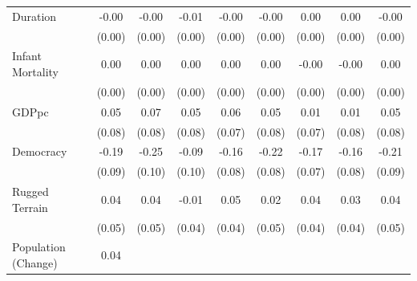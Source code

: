 \documentclass[12pt, letterpaper]{article}
\begin{document}
\begin{table}[htbp]
\begin{small}
\begin{tabular}{l*{8}{c}}
Duration            &       -0.00         &       -0.00         &       -0.01\sym{+}  &       -0.00         &       -0.00         &        0.00         &        0.00         &       -0.00         \\
                    &      (0.00)         &      (0.00)         &      (0.00)         &      (0.00)         &      (0.00)         &      (0.00)         &      (0.00)         &      (0.00)         \\
Infant Mortality    &        0.00         &        0.00         &        0.00         &        0.00         &        0.00         &       -0.00         &       -0.00         &        0.00         \\
                    &      (0.00)         &      (0.00)         &      (0.00)         &      (0.00)         &      (0.00)         &      (0.00)         &      (0.00)         &      (0.00)         \\
GDPpc               &        0.05         &        0.07         &        0.05         &        0.06         &        0.05         &        0.01         &        0.01         &        0.05         \\
                    &      (0.08)         &      (0.08)         &      (0.08)         &      (0.07)         &      (0.08)         &      (0.07)         &      (0.08)         &      (0.08)         \\
Democracy           &       -0.19\sym{**} &       -0.25\sym{**} &       -0.09         &       -0.16\sym{*}  &       -0.22\sym{**} &       -0.17\sym{**} &       -0.16\sym{*}  &       -0.21\sym{**} \\
                    &      (0.09)         &      (0.10)         &      (0.10)         &      (0.08)         &      (0.08)         &      (0.07)         &      (0.08)         &      (0.09)         \\
Rugged Terrain      &        0.04         &        0.04         &       -0.01         &        0.05         &        0.02         &        0.04         &        0.03         &        0.04         \\
                    &      (0.05)         &      (0.05)         &      (0.04)         &      (0.04)         &      (0.05)         &      (0.04)         &      (0.04)         &      (0.05)         \\
Population (Change) &        0.04         &                     &                     &                     &                     &                     &                     &                     \\

\end{tabular}
\end{small}
\end{table}
\end{document}
